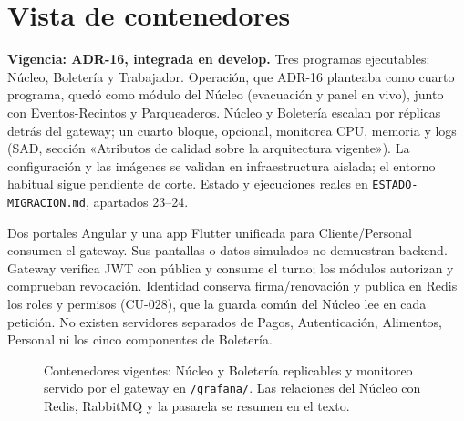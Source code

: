 \section{Vista de contenedores}
\label{sec:contenedores}
\textbf{Vigencia: ADR-16, integrada en develop.} Tres programas ejecutables:
Núcleo, Boletería y Trabajador. Operación, que ADR-16 planteaba como cuarto
programa, quedó como módulo del Núcleo (evacuación y panel en vivo), junto con
Eventos-Recintos y Parqueaderos. Núcleo y Boletería escalan por réplicas detrás del
gateway; un cuarto bloque, opcional, monitorea CPU, memoria y logs
(SAD, sección «Atributos de calidad sobre la arquitectura vigente»).
La configuración y las imágenes se validan en infraestructura aislada; el entorno
habitual sigue pendiente de corte. Estado y ejecuciones reales en
\texttt{ESTADO-MIGRACION.md}, apartados 23--24.

Dos portales Angular y una app Flutter unificada para Cliente/Personal consumen el
gateway. Sus pantallas o datos simulados no demuestran backend. Gateway verifica
JWT con pública y consume el turno; los módulos autorizan y comprueban revocación.
Identidad conserva firma/renovación y publica en Redis los roles y permisos (CU-028), que la guarda
común del Núcleo lee en cada petición. No existen servidores separados de Pagos,
Autenticación, Alimentos, Personal ni los cinco componentes de Boletería.

\begin{figure}[H]\centering\HexContenedores
\caption{Contenedores vigentes: Núcleo y Boletería replicables y monitoreo servido por el gateway en
\texttt{/grafana/}. Las relaciones del Núcleo con Redis, RabbitMQ y la pasarela se resumen en el texto.}
\label{fig:contenedores}\end{figure}

